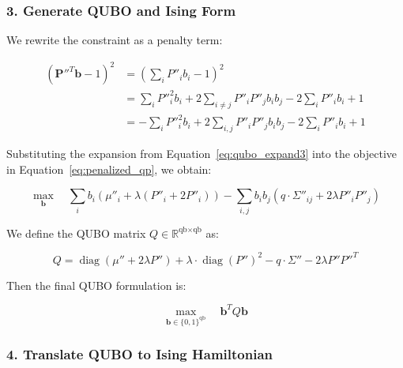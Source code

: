 \subsubsection*{3. Generate QUBO and Ising Form}

We rewrite the constraint as a penalty term:

\begin{align}
    (\mathbf{P}''^T \mathbf{b} - 1)^2 
    &= \left( \sum_i P''_i b_i - 1 \right)^2 \label{eq:qubo_expand1} \\
    &= \sum_i P''^2_i b_i + 2\sum_{i \ne j} P''_i P''_j b_i b_j - 2\sum_i P''_i b_i + 1 \label{eq:qubo_expand2} \\
    &= - \sum_i P''^2_i b_i + 2\sum_{i,j} P''_i P''_j b_i b_j - 2\sum_i P''_i b_i + 1 \label{eq:qubo_expand3}
\end{align}
    

Substituting the expansion from Equation~\eqref{eq:qubo_expand3} into the objective in Equation~\eqref{eq:penalized_qp}, we obtain:

\begin{equation}
\max_{\mathbf{b}} \quad \sum_i b_i \left( \mu''_i + \lambda(P''_i + 2P''_i) \right) 
- \sum_{i,j} b_i b_j \left( q \cdot \Sigma''_{ij} + 2\lambda P''_i P''_j \right)
\label{eq:qubo_objective_sum}
\end{equation}

We define the QUBO matrix \( Q \in \mathbb{R}^{\text{qb} \times \text{qb}} \) as:

\begin{equation}
Q = \operatorname{diag}(\mu'' + 2\lambda P'') + \lambda \cdot \operatorname{diag}(P'')^2 - q \cdot \Sigma'' - 2\lambda P'' P''^T
\label{eq:qubo_matrix}
\end{equation}

Then the final QUBO formulation is:

\begin{equation}
\max_{\mathbf{b} \in \{0,1\}^{\text{qb}}} \quad \mathbf{b}^T Q \mathbf{b}
\label{eq:qubo_final_form}
\end{equation}



\subsubsection*{4. Translate QUBO to Ising Hamiltonian}

